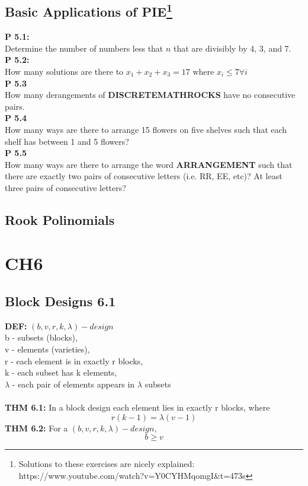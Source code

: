 \documentclass[12pt]{article}
\begin{document}
	\subsection{Basic Applications of PIE\footnote{Solutions to these exercises are nicely explained: https://www.youtube.com/watch?v=Y0CYHMqomgI&t=473s}}
		\textbf{P 5.1:}\\
		Determine the number of numbers less that $n$ that are divisibly by 4, 3, and 7.\\
		\textbf{P 5.2:}\\
		How many solutions are there to $x_1 + x_2 + x_3 = 17$ where $x_i \leq 7 \forall i$\\
		\textbf{P 5.3}\\
		How many derangements of \textbf{DISCRETEMATHROCKS} have no consecutive pairs.\\
		\textbf{P 5.4}\\
		How many ways are there to arrange 15 flowers on five shelves such that each shelf has between 1 and 5 flowers?\\
		\textbf{P 5.5}\\
		How many ways are there to arrange the word \textbf{ARRANGEMENT} such that there are exactly two pairs of consecutive letters (i.e. RR, EE, etc)? At least three pairs of consecutive letters?\\
		
	\subsection{Rook Polinomials}
		
		
	
	\section{CH6}
	\subsection{Block Designs 6.1}
	\textbf{DEF:} $ (b,v,r,k,\lambda)-design $ \\
	b - subsets (blocks),\\
	v - elements (varieties),\\
	r - each element is in exactly r blocks, \\
	k - each subset has k elements, \\
	$ \lambda $ - each pair of elements appears in $ \lambda $ subsets\\\\
	\textbf{THM 6.1:} In a block design each element lies in exactly r blocks, where
	\[ 	r(k-1) = \lambda(v-1) \]
	\textbf{THM 6.2:}  For a  $ (b,v,r,k,\lambda)-design $, 
	\[ b \geq v \]
	
\end{document}
